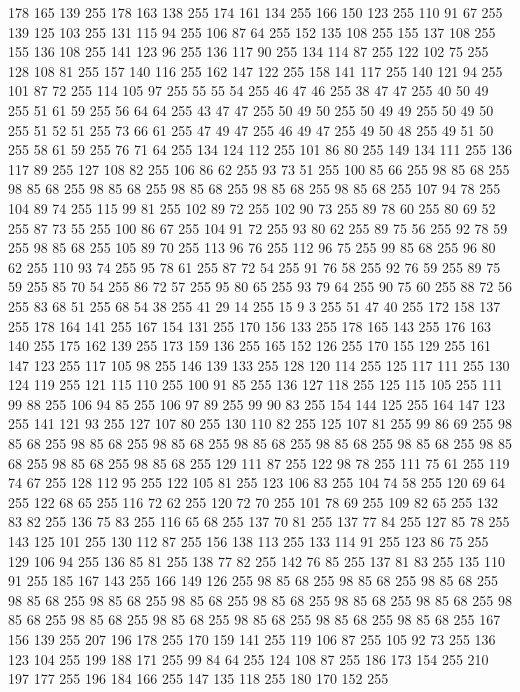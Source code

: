 178 165 139 255 178 163 138 255 174 161 134 255 166 150 123 255 110 91 67 255 139 125 103 255 131 115 94 255 106 87 64 255 152 135 108 255 155 137 108 255 155 136 108 255 141 123 96 255 136 117 90 255 134 114 87 255 122 102 75 255 128 108 81 255 157 140 116 255 162 147 122 255 158 141 117 255 140 121 94 255 101 87 72 255 114 105 97 255 55 55 54 255 46 47 46 255 38 47 47 255 40 50 49 255 51 61 59 255 56 64 64 255 43 47 47 255 50 49 50 255 50 49 49 255 50 49 50 255 51 52 51 255 73 66 61 255 47 49 47 255 46 49 47 255 49 50 48 255 49 51 50 255 58 61 59 255 76 71 64 255 134 124 112 255 101 86 80 255 149 134 111 255 136 117 89 255 127 108 82 255 106 86 62 255 93 73 51 255 100 85 66 255 98 85 68 255 98 85 68 255 98 85 68 255 98 85 68 255 98 85 68 255 98 85 68 255 107 94 78 255 104 89 74 255 115 99 81 255 102 89 72 255 102 90 73 255 89 78 60 255 80 69 52 255 87 73 55 255 100 86 67 255 104 91 72 255
93 80 62 255 89 75 56 255 92 78 59 255 98 85 68 255 105 89 70 255 113 96 76 255 112 96 75 255 99 85 68 255 96 80 62 255 110 93 74 255 95 78 61 255 87 72 54 255 91 76 58 255 92 76 59 255 89 75 59 255 85 70 54 255 86 72 57 255 95 80 65 255 93 79 64 255 90 75 60 255 88 72 56 255 83 68 51 255 68 54 38 255 41 29 14 255 15 9 3 255 51 47 40 255 172 158 137 255 178 164 141 255 167 154 131 255 170 156 133 255 178 165 143 255 176 163 140 255 175 162 139 255 173 159 136 255 165 152 126 255 170 155 129 255 161 147 123 255 117 105 98 255 146 139 133 255 128 120 114 255 125 117 111 255 130 124 119 255 121 115 110 255 100 91 85 255 136 127 118 255 125 115 105 255 111 99 88 255 106 94 85 255 106 97 89 255 99 90 83 255 154 144 125 255 164 147 123 255 141 121 93 255 127 107 80 255 130 110 82 255 125 107 81 255 99 86 69 255 98 85 68 255 98 85 68 255 98 85 68 255 98 85 68 255 98 85 68 255 98 85 68 255 98 85 68 255
98 85 68 255 98 85 68 255 129 111 87 255 122 98 78 255 111 75 61 255 119 74 67 255 128 112 95 255 122 105 81 255 123 106 83 255 104 74 58 255 120 69 64 255 122 68 65 255 116 72 62 255 120 72 70 255 101 78 69 255 109 82 65 255 132 83 82 255 136 75 83 255 116 65 68 255 137 70 81 255 137 77 84 255 127 85 78 255 143 125 101 255 130 112 87 255 156 138 113 255 133 114 91 255 123 86 75 255 129 106 94 255 136 85 81 255 138 77 82 255 142 76 85 255 137 81 83 255 135 110 91 255 185 167 143 255 166 149 126 255 98 85 68 255 98 85 68 255 98 85 68 255 98 85 68 255 98 85 68 255 98 85 68 255 98 85 68 255 98 85 68 255 98 85 68 255 98 85 68 255 98 85 68 255 98 85 68 255 98 85 68 255 98 85 68 255 98 85 68 255 167 156 139 255 207 196 178 255 170 159 141 255 119 106 87 255 105 92 73 255 136 123 104 255 199 188 171 255 99 84 64 255 124 108 87 255 186 173 154 255 210 197 177 255 196 184 166 255 147 135 118 255 180 170 152 255
